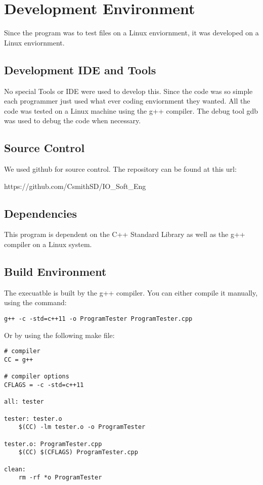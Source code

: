 \chapter{Development Environment}
Since the program was to test files on a Linux enviornment, it was developed on a Linux enviornment.


\section{Development IDE and Tools}
No special Tools or IDE were used to develop this.  Since the code was so simple
each programmer just used what ever coding enviornment they wanted.  All
the code was tested on a Linux machine using the g++ compiler.  The debug tool
gdb was used to debug the code when necessary.

\section{Source  Control}
We used github for source control.  The repository can be found at this url: 

https://github.com/CsmithSD/IO_Soft_Eng
\section{Dependencies}
This program is dependent on the C++ Standard Library as well as the g++ compiler
on a Linux system.

\section{Build  Environment}
The execuatble is built by the g++ compiler.  You can either compile it manually, using the command:
\begin{lstlisting}
g++ -c -std=c++11 -o ProgramTester ProgramTester.cpp
\end{lstlisting}
Or by using the following make file:

\begin{lstlisting}
# compiler
CC = g++

# compiler options
CFLAGS = -c -std=c++11

all: tester

tester: tester.o
	$(CC) -lm tester.o -o ProgramTester

tester.o: ProgramTester.cpp
	$(CC) $(CFLAGS) ProgramTester.cpp

clean:
	rm -rf *o ProgramTester
\end{lstlisting}

